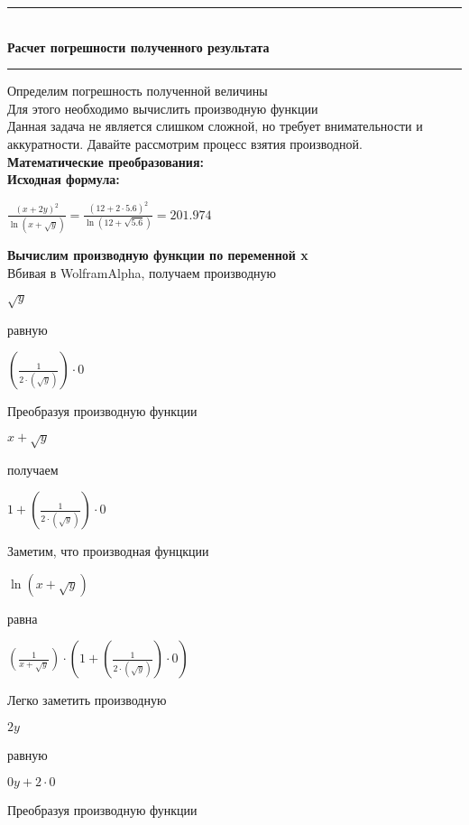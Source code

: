\documentclass{article}
\theoremstyle{definition}
\def \topic { Расчет погрешности полученного результата }
\begin{document}
	 		\begin{center}

	 			\newcommand{\HRule}{\rule{\linewidth}{0.5mm}}
	 			\HRule \\[0.2cm]
	 			{ \Huge \bfseries \topic} %
	 			\HRule

	 		\end{center}
	 		\Large

            Определим погрешность полученной величины\\
	 		Для этого необходимо вычислить производную функции\\
	 		Данная задача не является слишком сложной, но требует внимательности и аккуратности. Давайте рассмотрим процесс взятия производной.\\
	 		{\LARGE \bfseries \center Математические преобразования: \\}
{\LARGE \bfseries \center Исходная формула: \\}\begin{center}$\frac{(x + 2y) ^ 2}{ \ln (x +  \sqrt {y})} = \frac{(12 + 2 \cdot 5.6) ^ 2}{ \ln (12 +  \sqrt {5.6})} = 201.974$\end{center}{\LARGE \bfseries \center Вычислим производную функции по переменной x \\}Вбивая в WolframAlpha, получаем производную
\begin{center}$ \sqrt {y}$ \end{center}равную
\begin{center}$(\frac{1}{2 \cdot ( \sqrt {y})}) \cdot 0$ \end{center}Преобразуя производную функции
\begin{center}$x +  \sqrt {y}$ \end{center}получаем
\begin{center}$1 + (\frac{1}{2 \cdot ( \sqrt {y})}) \cdot 0$ \end{center}Заметим, что производная фунцкции
\begin{center}$ \ln (x +  \sqrt {y})$ \end{center}равна
\begin{center}$(\frac{1}{x +  \sqrt {y}}) \cdot (1 + (\frac{1}{2 \cdot ( \sqrt {y})}) \cdot 0)$ \end{center}Легко заметить производную
\begin{center}$2y$ \end{center}равную
\begin{center}$0y + 2 \cdot 0$ \end{center}Преобразуя производную функции
\end{document}
